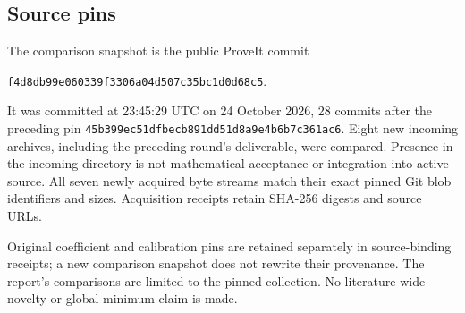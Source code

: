\subsection{Source pins}
The comparison snapshot is the public ProveIt commit
\begin{center}\small\nolinkurl{f4d8db99e060339f3306a04d507c35bc1d0d68c5}.\end{center}
It was committed at 23:45:29 UTC on 24 October 2026, 28 commits after the preceding pin \nolinkurl{45b399ec51dfbecb891dd51d8a9e4b6b7c361ac6}. Eight new incoming archives, including the preceding round's deliverable, were compared. Presence in the incoming directory is not mathematical acceptance or integration into active source. All seven newly acquired byte streams match their exact pinned Git blob identifiers and sizes. Acquisition receipts retain SHA-256 digests and source URLs.

Original coefficient and calibration pins are retained separately in source-binding receipts; a new comparison snapshot does not rewrite their provenance. The report's comparisons are limited to the pinned collection. No literature-wide novelty or global-minimum claim is made.
